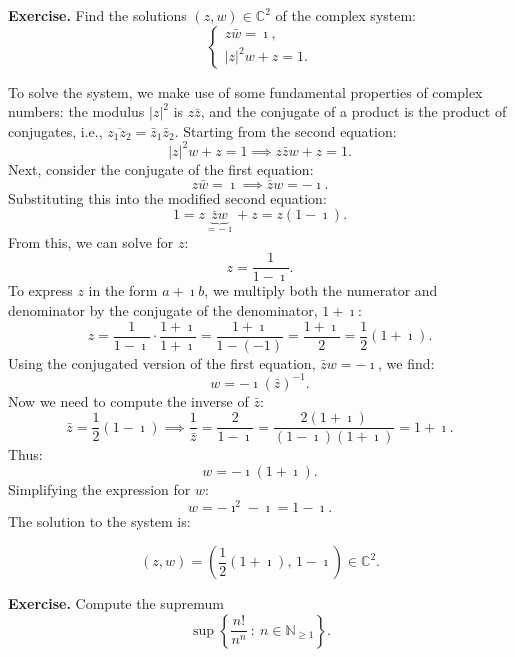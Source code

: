 \documentclass[a4paper,10 pt]{report}
\newcommand{\finalanswer}[1]{%
    \begin{finalAnswer}
    \[
        #1
    \]
    \end{finalAnswer}
}
\theoremstyle{definition}
\begin{document}
\begin{exerciseBox}
\textbf{Exercise.} Find the solutions $(z, w) \in \mathbb{C}^2$ of the complex system:
\[
\begin{cases} 
    z \bar{w} = \imath, \\
    |z|^2 w + z = 1. 
\end{cases}
\]
\end{exerciseBox}

\begin{solutionBox}
To solve the system, we make use of some fundamental properties of complex numbers: the modulus $|z|^2$ is $z \bar{z}$, and the conjugate of a product is the product of conjugates, i.e., $\overline{z_1 z_2} = \bar{z}_1 \bar{z}_2$. Starting from the second equation:
\[
|z|^2 w + z = 1 \implies z \bar{z} w + z = 1.
\]
Next, consider the conjugate of the first equation:
\[
z \bar{w} = \imath \implies \bar{z} w = -\imath.
\]
Substituting this into the modified second equation:
\[
1 = z \underbrace{\bar{z} w}_{= -\imath} + z = z(1 - \imath).
\]
From this, we can solve for $z$:
\[
z = \frac{1}{1 - \imath}.
\]
To express $z$ in the form $a + \imath b$, we multiply both the numerator and denominator by the conjugate of the denominator, $1 + \imath$:
\[
z = \frac{1}{1 - \imath} \cdot \frac{1 + \imath}{1 + \imath} = \frac{1 + \imath}{1 - (-1)} = \frac{1 + \imath}{2} = \frac{1}{2}(1 + \imath).
\]
Using the conjugated version of the first equation, $\bar{z} w = -\imath$, we find:
\[
w = -\imath (\bar{z})^{-1}.
\]
Now we need to compute the inverse of $\bar{z}$:
\[
\bar{z} = \frac{1}{2}(1 - \imath) \implies \frac{1}{\bar{z}} = \frac{2}{1 - \imath} = \frac{2(1 + \imath)}{(1 - \imath)(1 + \imath)} = 1 + \imath.
\]
Thus:
\[
w = -\imath (1 + \imath).
\]
Simplifying the expression for $w$:
\[
w = -\imath^2 - \imath = 1 - \imath.
\]
The solution to the system is:
\finalanswer{(z, w) = \left( \frac{1}{2}(1 + \imath), \, 1 - \imath \right) \in \mathbb{C}^2.}
\end{solutionBox}


\begin{exerciseBox}
\textbf{Exercise.} Compute the supremum
\[
\sup \left\{ \frac{n!}{n^n} \: : \: n \in \mathbb{N}_{\geq 1} \right\}.
\]
\end{exerciseBox}
\end{document}
